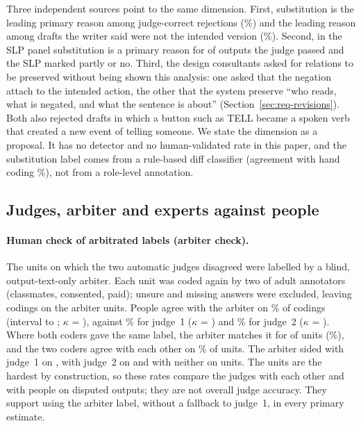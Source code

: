 Three independent sources point to the same dimension.
First, substitution is the leading primary reason among judge-correct rejections (\jmwmRightSubst{}\%) and the leading reason among drafts the writer said were not the intended version (\jmwmROneSubst{}\%).
Second, in the SLP panel substitution is a primary reason for \jmwmSlpSubstK{} of \jmwmSlpReasonN{} outputs the judge passed and the SLP marked partly or no.
Third, the design consultants asked for relations to be preserved without being shown this analysis: one asked that the negation attach to the intended action, the other that the system preserve ``who reads, what is negated, and what the sentence is about'' (Section~\ref{sec:req-revisions}).
Both also rejected drafts in which a button such as TELL became a spoken verb that created a new event of telling someone.
We state the dimension as a proposal.
It has no detector and no human-validated rate in this paper, and the substitution label comes from a rule-based diff classifier (agreement with hand coding \jmwmHandAgree{}\%), not from a role-level annotation.

\subsection{Judges, arbiter and experts against people}\label{sec:validity}

\paragraph{Human check of arbitrated labels (arbiter check).}
The \jmpOneNineUnits{} units on which the two automatic judges disagreed were labelled by a blind, output-text-only arbiter.
Each unit was coded again by two of \jmpOneNineAnnotators{} adult annotators (classmates, consented, paid); unsure and missing answers were excluded, leaving \jmpOneNineCodings{} codings on the arbiter units.
People agree with the arbiter on \jmpOneNineAgreeArb{}\% of codings (interval \jmpOneNineAgreeArbLo{} to \jmpOneNineAgreeArbHi{}; $\kappa$ = \jmpOneNineKappaArb{}), against \jmpOneNineAgreeJOne{}\% for judge~1 ($\kappa$ = \jmpOneNineKappaJOne{}) and \jmpOneNineAgreeJTwo{}\% for judge~2 ($\kappa$ = \jmpOneNineKappaJTwo{}).
Where both coders gave the same label, the arbiter matches it for \jmpOneNineItemAgreeArbK{} of \jmpOneNineItemAgreeArbN{} units (\jmpOneNineItemAgreeArb{}\%), and the two coders agree with each other on \jmpOneNineHumanHumanArb{}\% of units.
The arbiter sided with judge~1 on \jmpOneNineSidedJOne{}, with judge~2 on \jmpOneNineSidedJTwo{} and with neither on \jmpOneNineSidedNeither{} units.
The units are the hardest by construction, so these rates compare the judges with each other and with people on disputed outputs; they are not overall judge accuracy.
They support using the arbiter label, without a fallback to judge~1, in every primary estimate.

